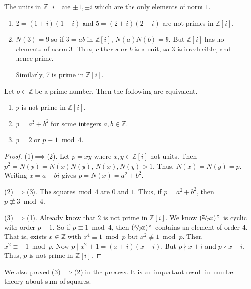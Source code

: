 The units in \(\mathbb{Z}[i]\) are \(\pm 1, \pm i\) which are the only elements of norm \(1\).
\begin{example}
    \begin{enumerate}
        \item \(2 = (1+i)(1-i)\) and \(5 = (2 + i)(2-i)\) are not primes in \(\mathbb{Z}[i]\).
        \item \(N(3) = 9\) so if \(3 = ab\) in \(\mathbb{Z}[i]\), \(N(a)N(b) = 9\). But \(\mathbb{Z}[i]\) has no elements of norm \(3\). Thus, either \(a\) or \(b\) is a unit, so \(3\) is irreducible, and hence prime.
        
        Similarly, 7 is prime in \(\mathbb{Z}[i]\).
    \end{enumerate}
\end{example}
\begin{proposition}{}{}
    \label{ratprime}
    Let \(p \in \mathbb{Z}\) be a prime number. Then the following are equivalent.
    \begin{enumerate}
        \item \(p\) is not prime in \(\mathbb{Z}[i]\).
        \item \(p = a^2 + b^2\) for some integers \(a, b \in \mathbb{Z}\).
        \item \(p = 2\) or \(p \equiv 1 \bmod 4\).
    \end{enumerate}
\end{proposition}
\begin{proof}
    (1)\(\implies\)(2). Let \(p = xy\) where \(x, y \in \mathbb{Z}[i]\) not units. Then \(p^2 = N(p) = N(x)N(y)\), \(N(x),N(y) > 1\). Thus, \(N(x) = N(y) = p\). Writing \(x = a + bi\) gives \(p = N(x) = a^2 + b^2\).

    (2)\(\implies\)(3). The squares\({}\bmod 4\) are \(0\) and \(1\). Thus, if \(p = a^2 + b^2\), then \(p \not\equiv 3 \bmod 4\).
    
    (3)\(\implies\)(1). Already know that \(2\) is not prime in \(\mathbb{Z}[i]\). We know \((\nicefrac{\mathbb{Z}}{p\mathbb{Z}})^\times\) is cyclic with order \(p - 1\). So if \(p \equiv 1 \bmod 4\), then \((\nicefrac{\mathbb{Z}}{p\mathbb{Z}})^\times\) contains an element of order \(4\). That is, exists \(x \in \mathbb{Z}\) with \(x^4 \equiv 1 \bmod p\) but \(x^2 \not \equiv 1 \bmod p\). Then \(x^2 \equiv -1 \bmod p\). Now \(p \mid x^2 + 1 = (x + i)(x - i)\). But \(p \nmid x + i\) and \(p \nmid x - i\). Thus, \(p\) is not prime in \(\mathbb{Z}[i]\).
\end{proof}
\begin{remark}
    We also proved (3)\(\implies\)(2) in the process. It is an important result in number theory about sum of squares.
\end{remark}
